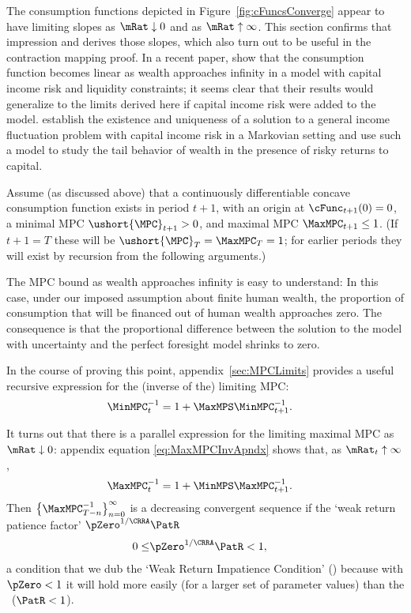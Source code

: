\documentclass[./BufferStockTheory.tex]{subfiles}
\begin{document}
The consumption functions depicted in Figure~\ref{fig:cFuncsConverge} appear
to have limiting slopes as $\mRat \downarrow 0$ and as $\mRat \uparrow
\infty$.  This section confirms that impression and derives those
slopes, which also turn out to be useful in the contraction
mapping proof.  In a recent paper, \cite{benhabibWealth} show that the consumption function
becomes linear as wealth approaches infinity in a model with capital income risk and liquidity
constraints; it seems clear that their results would generalize to the limits derived here if capital income risk were added to the model.  \cite{MaStachurskiToda2020JET} establish the existence and uniqueness of a solution to a general income fluctuation problem with capital income risk in a Markovian setting and use such a model to study the tail behavior of wealth in the presence of risky returns to capital.

\newcommand{\NewMaxMinMPC}{\ushort{\MPC}}

Assume (as discussed above) that a continuously differentiable
concave consumption function exists in period $t+1$, with an origin at
$\cFunc_{t+1}(0)=0$, a minimal MPC $\NewMaxMinMPC_{t+1}>0$, and
maximal MPC $\MaxMPC_{t+1} \leq 1$.  (If $t+1 = T$ these will be
$\NewMaxMinMPC_{T}=\MaxMPC_{T}=1$; for earlier periods they will exist
by recursion from the following arguments.)

The MPC bound as wealth approaches infinity is easy to understand: In this case,
under our imposed assumption about finite human wealth, the proportion of consumption
that will be financed out of human wealth approaches zero. The
consequence is that the proportional difference between the solution to the
model with uncertainty and the perfect foresight model shrinks to zero.

\hypertarget{MPCnvrsLower}{}
In the course of proving this point, appendix~\ref{sec:MPCLimits}  provides a useful recursive expression for the (inverse of the) limiting MPC: 
\begin{align}
 \MinMPC_{t}^{-1}  & = 1+\MaxMPS \MinMPC_{t+1}^{-1} \label{eq:MinMPCInv}.
\end{align}

\hypertarget{MPCnvrsUpper}{}
\hypertarget{WRIC}{}
It turns out that there is a parallel expression for the limiting maximal 
 MPC as $\mRat \downarrow 0$: appendix equation \eqref{eq:MaxMPCInvApndx}  shows that, as $\mRat_{t} \uparrow \infty$,
\begin{align}
 \MaxMPC_{t}^{-1}  & = 1+\MinMPS \MaxMPC_{t+1}^{-1} \label{eq:MaxMPCInv}.
\end{align}
\hypertarget{WRIF}{}  
Then
$\left\{\MaxMPC_{T-n}^{-1}\right\} _{n=0}^{\infty}$ is a decreasing %
convergent sequence if the `weak return patience factor' $\pZero^{1/\CRRA}\PatR$ 
\begin{align}
  0 \leq & \pZero^{1/\CRRA} \PatR < 1 \label{eq:WRIC},
\end{align}
a condition that we dub the `Weak Return Impatience Condition' (\WRIC)
because with $\pZero < 1$ it will hold more easily (for a larger set of parameter
values) than the \RIC~($\PatR < 1$).
\end{document}
